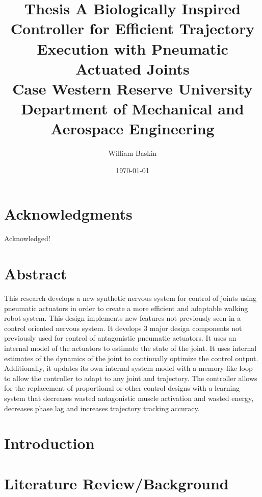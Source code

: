 \documentclass[12pt, letterpaper, oneside, onecolumn]{report} %
\author{William Baskin}
\title{Thesis}
\title{
  {A Biologically Inspired Controller for Efficient Trajectory Execution with Pneumatic Actuated Joints}\\
  {\large Case Western Reserve University \\
  Department of Mechanical and Aerospace Engineering}%
}
\date{\today}
\begin{document}
\maketitle


\tableofcontents

\listoffigures

\chapter*{Acknowledgments}
\label{chap:acknowledgements}
Acknowledged!

\chapter*{Abstract}
\label{chap:abstract}

This research develops a new synthetic nervous system for control of joints using pneumatic actuators in order to create a more efficient and adaptable walking robot system. This design implements new features not previously seen in a control oriented nervous system. It develops 3 major design components not previously used for control of antagonistic pneumatic actuators. It uses an internal model of the actuators to estimate the state of the joint. It uses internal estimates of the dynamics of the joint to continually optimize the control output. Additionally, it updates its own internal system model with a memory-like loop to allow the controller to adapt to any joint and trajectory. The controller allows for the replacement of proportional or other control designs with a learning system that decreases wasted antagonistic muscle activation and wasted energy, decreases phase lag and increases trajectory tracking accuracy.

\chapter{Introduction}
\label{chap:introduction}



\chapter{Literature Review/Background}
\label{chap:lit_review}

\end{document}
